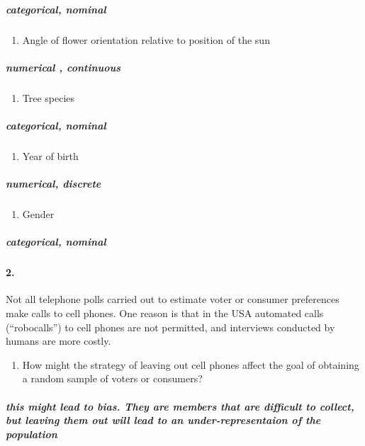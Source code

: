 \documentclass[]{article}
\providecommand{\tightlist}{%
  \setlength{\itemsep}{0pt}\setlength{\parskip}{0pt}}
\let\oldparagraph\paragraph
\renewcommand{\paragraph}[1]{\oldparagraph{#1}\mbox{}}
\let\oldsubparagraph\subparagraph
\renewcommand{\subparagraph}[1]{\oldsubparagraph{#1}\mbox{}}
\begin{document}
\subparagraph{categorical, nominal}\label{categorical-nominal}

\begin{enumerate}
\def\labelenumi{\alph{enumi}.}
\setcounter{enumi}{5}
\tightlist
\item
  Angle of flower orientation relative to position of the sun
\end{enumerate}

\subparagraph{numerical , continuous}\label{numerical-continuous-2}

\begin{enumerate}
\def\labelenumi{\alph{enumi}.}
\setcounter{enumi}{6}
\tightlist
\item
  Tree species
\end{enumerate}

\subparagraph{categorical, nominal}\label{categorical-nominal-1}

\begin{enumerate}
\def\labelenumi{\alph{enumi}.}
\setcounter{enumi}{7}
\tightlist
\item
  Year of birth
\end{enumerate}

\subparagraph{numerical, discrete}\label{numerical-discrete-2}

\begin{enumerate}
\def\labelenumi{\roman{enumi}.}
\tightlist
\item
  Gender
\end{enumerate}

\subparagraph{categorical, nominal}\label{categorical-nominal-2}

\paragraph{2.}\label{section-1}

Not all telephone polls carried out to estimate voter or consumer
preferences make calls to cell phones. One reason is that in the USA
automated calls (``robocalls'') to cell phones are not permitted, and
interviews conducted by humans are more costly.

\begin{enumerate}
\def\labelenumi{\alph{enumi}.}
\tightlist
\item
  How might the strategy of leaving out cell phones affect the goal of
  obtaining a random sample of voters or consumers?
\end{enumerate}

\subparagraph{this might lead to bias. They are members that are
difficult to collect, but leaving them out will lead to an
under-representaion of the
population}\label{this-might-lead-to-bias.-they-are-members-that-are-difficult-to-collect-but-leaving-them-out-will-lead-to-an-under-representaion-of-the-population}
\end{document}
